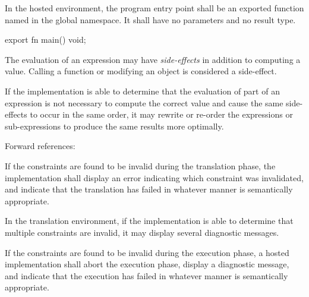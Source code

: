 
\specsubsubitem
In the hosted environment, the program entry point shall be an exported
function named  in the global namespace. It shall have no parameters
and no result type.


\begin{codesample}
export fn main() void;
\end{codesample}



\specsubsubitem
The evaluation of an expression may have \textit{side-effects} in addition to
computing a value. Calling a function or modifying an object is considered a
side-effect.

\specsubsubitem
If the implementation is able to determine that the evaluation of part of an
expression is not necessary to compute the correct value and cause the same
side-effects to occur in the same order, it may rewrite or re-order the
expressions or sub-expressions to produce the same results more optimally.


Forward references: 


\specsubitem
If the constraints are found to be invalid during the translation phase, the
implementation shall display an error indicating which constraint was
invalidated, and indicate that the translation has failed in whatever manner is
semantically appropriate.


\specsubitem
In the translation environment, if the implementation is able to determine that
multiple constraints are invalid, it may display several diagnostic messages.

\specsubitem
If the constraints are found to be invalid during the execution phase, a hosted
implementation shall abort the execution phase, display a diagnostic message,
and indicate that the execution has failed in whatever manner is semantically
appropriate.
